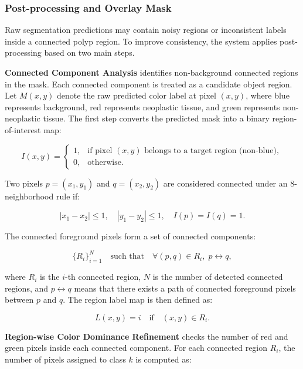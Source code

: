 \subsubsection{Post-processing and Overlay Mask}

Raw segmentation predictions may contain noisy regions or inconsistent labels inside a connected polyp region. To improve consistency, the system applies post-processing based on two main steps.

\textbf{Connected Component Analysis} identifies non-background connected regions in the mask. Each connected component is treated as a candidate object region. Let $M(x,y)$ denote the raw predicted color label at pixel $(x,y)$, where blue represents background, red represents neoplastic tissue, and green represents non-neoplastic tissue. The first step converts the predicted mask into a binary region-of-interest map:

\begin{equation}
I(x,y)=
\begin{cases}
1, & \text{if pixel } (x,y) \text{ belongs to a target region (non-blue)},\\
0, & \text{otherwise}.
\end{cases}
\end{equation}

Two pixels $p=(x_1,y_1)$ and $q=(x_2,y_2)$ are considered connected under an 8-neighborhood rule if:

\begin{equation}
|x_1-x_2| \leq 1,\quad |y_1-y_2| \leq 1,\quad I(p)=I(q)=1.
\end{equation}

The connected foreground pixels form a set of connected components:

\begin{equation}
\{R_i\}_{i=1}^{N}
\quad \text{such that} \quad
\forall (p,q)\in R_i,\; p \leftrightarrow q,
\end{equation}

where $R_i$ is the $i$-th connected region, $N$ is the number of detected connected regions, and $p \leftrightarrow q$ means that there exists a path of connected foreground pixels between $p$ and $q$. The region label map is then defined as:

\begin{equation}
L(x,y)=i \quad \text{if} \quad (x,y)\in R_i.
\end{equation}

\textbf{Region-wise Color Dominance Refinement} checks the number of red and green pixels inside each connected component. For each connected region $R_i$, the number of pixels assigned to class $k$ is computed as:

